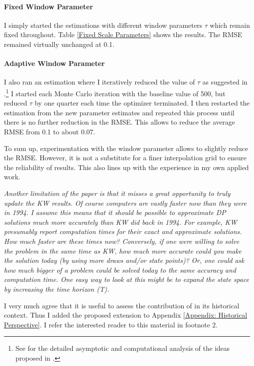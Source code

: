 \begin{boenumerate}
\paragraph{Fixed Window Parameter} I simply started the estimations with different window parameters $\tau$ which remain fixed throughout. Table \ref{Fixed Scale Parameters} shows the results. The RMSE remained virtually unchanged at 0.1.



\paragraph{Adaptive Window Parameter} I also ran an estimation where I iteratively reduced the value of $\tau$ as suggested in \citet{Keane.2003}.\footnote{See \citet{Bruins.2015} for the detailed asymptotic and computational analysis of the ideas proposed in \citet{Keane.2003}.} I started each Monte Carlo iteration with the baseline value of 500, but reduced $\tau$ by one quarter each time the optimizer terminated. I then restarted the estimation from the new parameter estimates and repeated this process until there is no further reduction in the RMSE. This allows to reduce the average RMSE from 0.1 to about 0.07.\newline

To sum up, experimentation with the window parameter allows to slightly reduce the RMSE. However, it is not a substitute for a finer interpolation grid to ensure the reliability of results. This also lines up with the experience in my own applied work.\newline
\item \textit{Another limitation of the paper is that it misses a great opportunity to truly update the KW results. Of course computers are vastly faster now than they were in 1994. I assume this means that it should be possible to approximate DP solutions much more accurately than KW did back in 1994. For example, KW presumably report computation times for their exact and approximate solutions. How much faster are these times now? Conversely, if one were willing to solve the problem in the same time as KW, how much more accurate could you make the solution today (by using more draws and/or state points)? Or, one could ask how much bigger of a problem could be solved today to the same accuracy and computation time. One easy way to look at this might be to expand the state space by increasing the time horizon (T).}\vspace{0.5cm}

I very much agree that it is useful to assess the contribution of \citet{Keane.1994} in its historical context. Thus I added the proposed extension to Appendix \ref{Appendix: Historical Perspective}. I refer the interested reader to this material in footnote 2.
\end{boenumerate}
